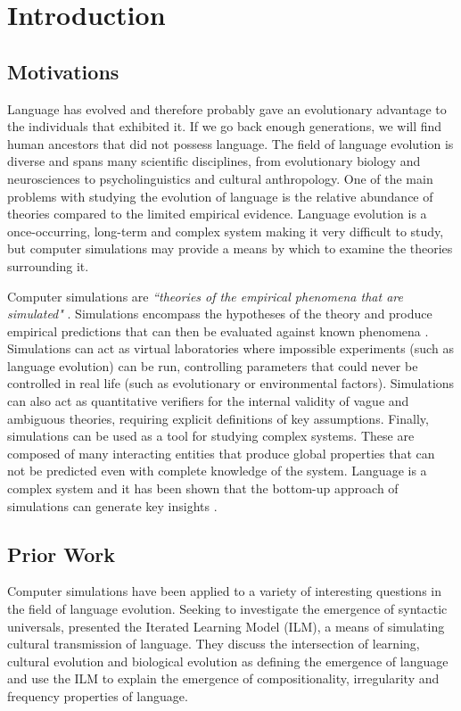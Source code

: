 \documentclass[12pt,a4paper,twoside,openright]{report}
\begin{document}
\pagestyle{headings}

\chapter{Introduction}

\section{Motivations}

Language has evolved and therefore probably gave an evolutionary advantage to the individuals that exhibited it. If we go back enough generations, we will find human ancestors that did not possess language. The field of language evolution is diverse and spans many scientific disciplines, from evolutionary biology and neurosciences to psycholinguistics and cultural anthropology. One of the main problems with studying the evolution of language is the relative abundance of theories compared to the limited empirical evidence. Language evolution is a once-occurring, long-term and complex system making it very difficult to study, but computer simulations may provide a means by which to examine the theories surrounding it.

Computer simulations are \emph{``theories of the empirical phenomena that are simulated"} \citep{cangelosi2012simulating}. Simulations encompass the hypotheses of the theory and produce empirical predictions that can then be evaluated against known phenomena \citet{cavalli1997genes}. Simulations can act as virtual laboratories where impossible experiments (such as language evolution) can be run, controlling parameters that could never be controlled in real life (such as evolutionary or environmental factors). Simulations can also act as quantitative verifiers for the internal validity of vague and ambiguous theories, requiring explicit definitions of key assumptions. Finally, simulations can be used as a tool for studying complex systems. These are composed of many interacting entities that produce global properties that can not be predicted even with complete knowledge of the system. Language is a complex system and it has been shown that the bottom-up approach of simulations can generate key insights \citep{langton1997artificial}.

\section{Prior Work}

Computer simulations have been applied to a variety of interesting questions in the field of language evolution. Seeking to investigate the emergence of syntactic universals, \citet{kirby2002emergence} presented the Iterated Learning Model (ILM), a means of simulating cultural transmission of language. They discuss the intersection of learning, cultural evolution and biological evolution as defining the emergence of language and use the ILM to explain the emergence of compositionality, irregularity and frequency properties of language.
\end{document}
